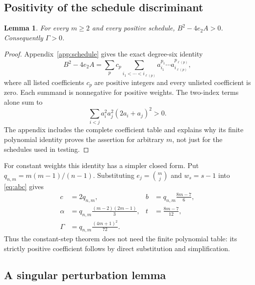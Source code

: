 \documentclass[11pt,letterpaper]{article}
\numberwithin{equation}{section}
\newtheorem{lemma}[theorem]{Lemma}
\theoremstyle{definition}
\begin{document}
\subsection{Positivity of the schedule discriminant}

\begin{lemma}\label{lem:discriminant}
For every $m\ge2$ and every positive schedule, $B^2-4e_2A>0$. Consequently $\Gamma>0$.
\end{lemma}
\begin{proof}
Appendix~\ref{app:schedule} gives the exact degree-six identity
\[
 B^2-4e_2A=\sum_p c_p\sum_{i_1<\cdots<i_{\ell(p)}}
       a_{i_1}^{p_1}\cdots a_{i_{\ell(p)}}^{p_{\ell(p)}},
\]
where all listed coefficients $c_p$ are positive integers and every unlisted coefficient is zero. Each summand is nonnegative for positive weights. The two-index terms alone sum to
\[
 \sum_{i<j}a_i^2a_j^2(2a_i+a_j)^2>0.
\]
The appendix includes the complete coefficient table and explains why its finite polynomial identity proves the assertion for arbitrary $m$, not just for the schedules used in testing.
\end{proof}

For constant weights this identity has a simpler closed form. Put $q_{n,m}=m(m-1)/(n-1)$. Substituting $e_j=\binom mj$ and $w_s=s-1$ into \eqref{eq:abc} gives
\begin{equation}\label{eq:constantcoeff}
 \begin{aligned}
 c&=2q_{n,m},&
 b&=q_{n,m}\frac{8m-7}{6},\\
 \alpha&=q_{n,m}\frac{(m-2)(2m-1)}3,&
 t&=\frac{8m-7}{12},\\
 \Gamma&=q_{n,m}\frac{(4m+1)^2}{72}.&&
 \end{aligned}
\end{equation}
Thus the constant-step theorem does not need the finite polynomial table: its strictly positive coefficient follows by direct substitution and simplification.

\subsection{A singular perturbation lemma}
\end{document}
